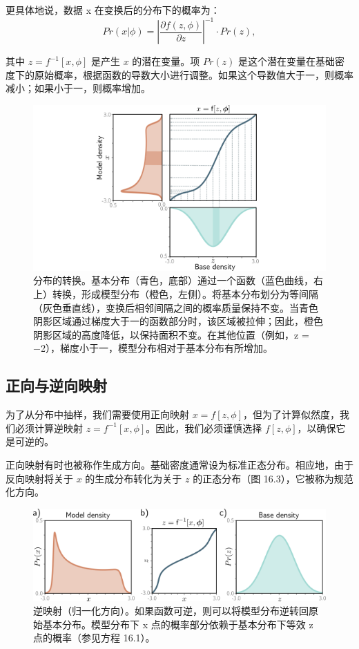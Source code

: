 更具体地说，数据 x 在变换后的分布下的概率为：
\begin{equation}
Pr(x|\phi) = \left| \frac{\partial f(z, \phi)}{\partial z} \right|^{-1} \cdot Pr(z), 
\end{equation}

其中 \(z = f^{-1}[x, \phi]\) 是产生 \(x\) 的潜在变量。项 \(Pr(z)\) 是这个潜在变量在基础密度下的原始概率，根据函数的导数大小进行调整。如果这个导数值大于一，则概率减小；如果小于一，则概率增加。

\begin{figure}[ht!]
\centering
\includegraphics[width=0.7\linewidth]{png/chapter16/FlowIntroTransformDensity.png}
\caption{分布的转换。基本分布（青色，底部）通过一个函数（蓝色曲线，右上）转换，形成模型分布（橙色，左侧）。将基本分布划分为等间隔（灰色垂直线），变换后相邻间隔之间的概率质量保持不变。当青色阴影区域通过梯度大于一的函数部分时，该区域被拉伸；因此，橙色阴影区域的高度降低，以保持面积不变。在其他位置（例如，z = −2），梯度小于一，模型分布相对于基本分布有所增加。}
\end{figure}


\subsection{正向与逆向映射}
为了从分布中抽样，我们需要使用正向映射 \(x = f[z, \phi]\)，但为了计算似然度，我们必须计算逆映射 \(z = f^{-1}[x, \phi]\)。因此，我们必须谨慎选择 \(f[z, \phi]\)，以确保它是可逆的。

正向映射有时也被称作生成方向。基础密度通常设为标准正态分布。相应地，由于反向映射将关于 \(x\) 的生成分布转化为关于 \(z\) 的正态分布（图 16.3），它被称为规范化方向。

\begin{figure}[ht!]
\centering
\includegraphics[width=0.7\linewidth]{png/chapter16/FlowIntroInverse.png}
\caption{逆映射（归一化方向）。如果函数可逆，则可以将模型分布逆转回原始基本分布。模型分布下 x 点的概率部分依赖于基本分布下等效 z 点的概率（参见方程 16.1）。}
\end{figure}


